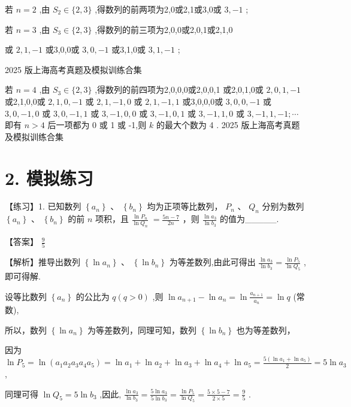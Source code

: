 \documentclass[10pt]{article}
\begin{document}
若 \(n = 2\) ,由 \({S}_{2} \in  \{ 2,3\}\) ,得数列的前两项为2,0或2,1或3,0或 \(3, - 1\) ;

若 \(n = 3\) ,由 \({S}_{3} \in  \{ 2,3\}\) ,得数列的前三项为2,0,0或2,0,1或2,1,0

或 \(2,1, - 1\) 或3,0,0或 \(3,0, - 1\) 或3,1,0或 \(3,1, - 1\) ;

2025 版上海高考真题及模拟训练合集

若 \(n = 4\) ,由 \({S}_{3} \in  \{ 2,3\}\) ,得数列的前四项为2,0,0,0或2,0,0,1 或2,0,1,0或 \(2,0,1, - 1\) 或2,1,0,0或 \(2,1,0, - 1\) 或 \(2,1, - 1,0\) 或 \(2,1, - 1,1\) 或3,0,0,0或 \(3,0,0, - 1\) 或 \(3,0, - 1,0\) 或 \(3,0, - 1,1\) 或 \(3, - 1,0,0\) 或 \(3, - 1,0,1\) 或 \(3, - 1,1,0\) 或 \(3, - 1,1, - 1;\cdots\) 即有 \(n > 4\) 后一项都为 0 或 1 或 -1,则 \(k\) 的最大个数为 4 . 2025 版上海高考真题及模拟训练合集

\section*{2. 模拟练习}

【练习】1. 已知数列 \(\left\{  {a}_{n}\right\}\) 、 \(\left\{  {b}_{n}\right\}\) 均为正项等比数列， \({P}_{n}\) 、 \({Q}_{n}\) 分别为数列 \(\left\{  {a}_{n}\right\}\) 、 \(\left\{  {b}_{n}\right\}\) 的前 \(n\) 项积，且 \(\frac{\ln {P}_{n}}{\ln {Q}_{n}} \; = \frac{{5n} - 7}{2n}\) ，则 \(\frac{\ln {a}_{3}}{\ln {b}_{3}}\) 的值为\_\_\_\_\_.

【答案】 \(\frac{9}{5}\)

【解析】推导出数列 \(\left\{  {\ln {a}_{n}}\right\}  \text{ 、 }\left\{  {\ln {b}_{n}}\right\}\) 为等差数列,由此可得出 \(\frac{\ln {a}_{3}}{\ln {b}_{3}} = \frac{\ln {P}_{5}}{\ln {Q}_{5}}\) ,即可得解.

设等比数列 \(\left\{  {a}_{n}\right\}\) 的公比为 \(q\left( {q > 0}\right)\) ,则 \(\ln {a}_{n + 1} - \ln {a}_{n} = \ln \frac{{a}_{n + 1}}{{a}_{n}} = \ln q\) (常数),

所以，数列 \(\left\{  {\ln {a}_{n}}\right\}\) 为等差数列，同理可知，数列 \(\left\{  {\ln {b}_{n}}\right\}\) 也为等差数列，

因为 \(\ln {P}_{5} = \ln \left( {{a}_{1}{a}_{2}{a}_{3}{a}_{4}{a}_{5}}\right)  = \ln {a}_{1} + \ln {a}_{2} + \ln {a}_{3} + \ln {a}_{4} + \ln {a}_{5} = \frac{5\left( {\ln {a}_{1} + \ln {a}_{5}}\right) }{2} = 5\ln {a}_{3}\) ,

同理可得 \(\ln {Q}_{5} = 5\ln {b}_{3}\) ,因此, \(\frac{\ln {a}_{3}}{\ln {b}_{3}} = \frac{5\ln {a}_{3}}{5\ln {b}_{3}} = \frac{\ln {P}_{5}}{\ln {Q}_{5}} = \frac{5 \times  5 - 7}{2 \times  5} = \frac{9}{5}\) .
\end{document}
